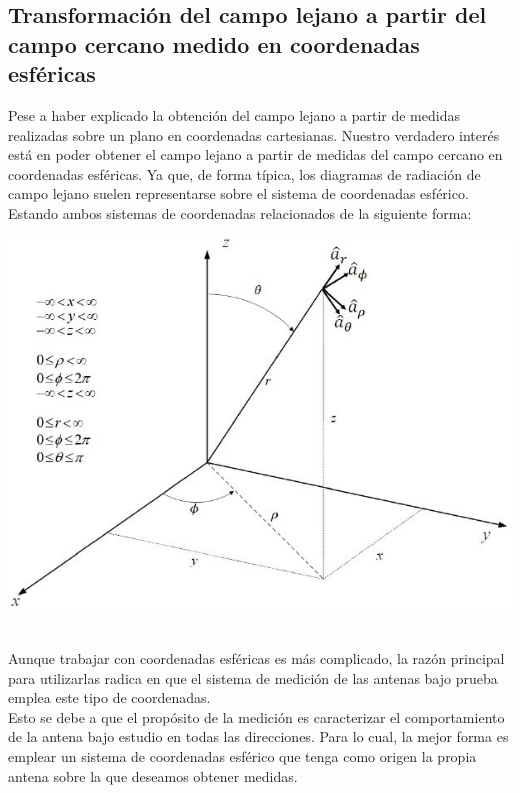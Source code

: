 \documentclass{article}
\begin{document}
\newpage

\subsection{Transformación del campo lejano a partir del campo cercano medido en coordenadas esféricas}

Pese a haber explicado la obtención del campo lejano a partir de medidas realizadas sobre un plano en coordenadas cartesianas. Nuestro verdadero interés está en poder obtener el campo lejano a partir de medidas del campo cercano en coordenadas esféricas.
Ya que, de forma típica, los diagramas de radiación de campo lejano suelen representarse sobre el sistema de coordenadas esférico. \\

Estando ambos sistemas de coordenadas relacionados de la siguiente forma:


\includegraphics[scale=0.65]{relacion_esfericas_cartesianas}

\\ 

Aunque trabajar con coordenadas esféricas es más complicado, la razón principal para utilizarlas radica en que el sistema de medición de las antenas bajo prueba emplea este tipo de coordenadas.\\
Esto se debe a  que el propósito de la medición es caracterizar el comportamiento de la antena bajo estudio en todas las direcciones. Para lo cual,  la mejor forma es emplear un sistema de coordenadas esférico que tenga como origen la propia antena sobre la que deseamos obtener medidas.
\\
\end{document}
